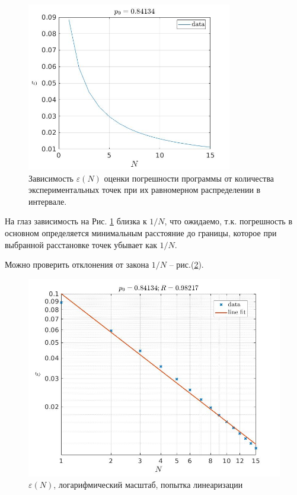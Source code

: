 \documentclass[a4paper,12pt]{article} %
\begin{document}
\begin{figure}[h!]
\begin{center}
\includegraphics[width=0.8\textwidth]{./pics/linear}
\end{center}
\caption{Зависимость $\varepsilon(N)$ оценки погрешности программы  от количества экспериментальных точек при их равномерном распределении в интервале.} \label{img:linear}
\end{figure}

\newpage

На глаз зависимость на Рис. \ref{img:linear} близка к $1/N$, что ожидаемо, т.к. погрешность в основном определяется минимальным расстояние до границы, которое при выбранной расстановке точек убывает как $1/N$. 

Можно проверить отклонения от закона $1/N$ -- рис.(\ref{img:log}).

\begin{figure}[h!]
\begin{center}
\includegraphics[width=1\textwidth]{./pics/log}
\end{center}
\caption{$\varepsilon(N)$, логарифмический масштаб, попытка линеаризации} \label{img:log}
\end{figure}
\end{document}
